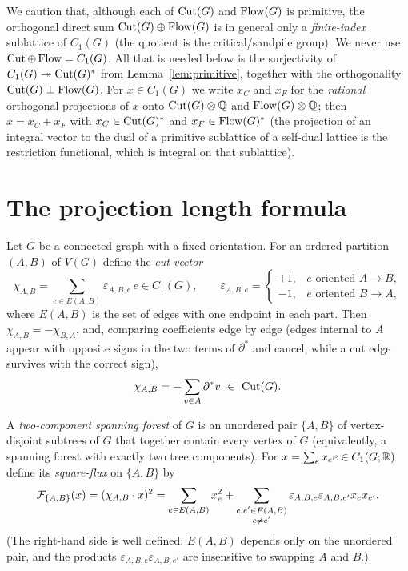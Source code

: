 \begin{rem}
\label{rem:proj}
We caution that, although each of $\operatorname{Cut}(G)$ and $\operatorname{Flow}(G)$ is primitive, the orthogonal
direct sum $\operatorname{Cut}(G)\oplus\operatorname{Flow}(G)$ is in general only a \emph{finite-index} sublattice of
$C_1(G)$ (the quotient is the critical/sandpile group).  We never use
$\operatorname{Cut}\oplus\operatorname{Flow}=C_1(G)$.  All that is needed below is the surjectivity of
$C_1(G)\twoheadrightarrow\operatorname{Cut}(G)^\ast$ from Lemma~\ref{lem:primitive}, together with the
orthogonality $\operatorname{Cut}(G)\perp\operatorname{Flow}(G)$.  For $x\in C_1(G)$ we write $x_C$ and $x_F$ for the
\emph{rational} orthogonal projections of $x$ onto $\operatorname{Cut}(G)\otimes\mathbb{Q}$ and
$\operatorname{Flow}(G)\otimes\mathbb{Q}$; then $x=x_C+x_F$ with $x_C\in\operatorname{Cut}(G)^\ast$ and $x_F\in\operatorname{Flow}(G)^\ast$
(the projection of an integral vector to the dual of a primitive sublattice of a self-dual
lattice is the restriction functional, which is integral on that sublattice).
\end{rem}

\section{The projection length formula}
\label{sec:length}

Let $G$ be a connected graph with a fixed orientation.  For an ordered partition $(A,B)$ of
$V(G)$ define the \emph{cut vector}
\[
\chi_{A,B}=\sum_{e\in E(A,B)}\varepsilon_{A,B,e}\,e\in C_1(G),
\qquad
\varepsilon_{A,B,e}=\begin{cases}+1,&e\text{ oriented }A\to B,\\-1,&e\text{ oriented }B\to A,\end{cases}
\]
where $E(A,B)$ is the set of edges with one endpoint in each part.  Then
$\chi_{A,B}=-\chi_{B,A}$, and, comparing coefficients edge by edge (edges internal to $A$
appear with opposite signs in the two terms of $\partial^\ast$ and cancel, while a cut edge
survives with the correct sign),
\begin{equation}
\label{eq:chi}
\chi_{A,B}=-\sum_{v\in A}\partial^\ast v\ \in\ \operatorname{Cut}(G).
\end{equation}

A \emph{two-component spanning forest} of $G$ is an unordered pair $\{A,B\}$ of vertex-disjoint
subtrees of $G$ that together contain every vertex of $G$ (equivalently, a spanning forest
with exactly two tree components).  For $x=\sum_e x_e e\in C_1(G;\mathbb{R})$ define its
\emph{square-flux} on $\{A,B\}$ by
\begin{equation}
\label{eq:flux}
\mathcal{F}_{\{A,B\}}(x)=(\chi_{A,B}\cdot x)^2
=\sum_{e\in E(A,B)}x_e^2+\sum_{\substack{e,e'\in E(A,B)\\ e\ne e'}}\varepsilon_{A,B,e}\varepsilon_{A,B,e'}x_ex_{e'} .
\end{equation}
(The right-hand side is well defined: $E(A,B)$ depends only on the unordered pair, and the
products $\varepsilon_{A,B,e}\varepsilon_{A,B,e'}$ are insensitive to swapping $A$ and $B$.)

